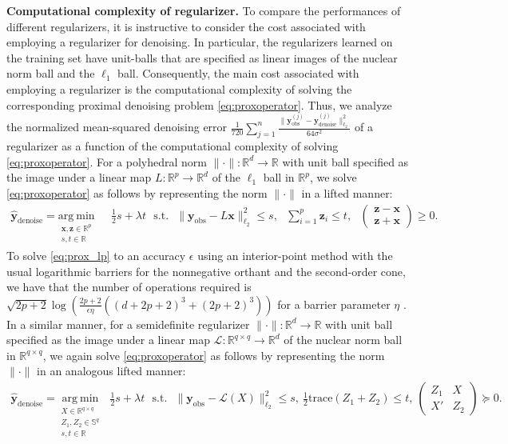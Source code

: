\documentclass[11pt,letterpaper]{article}
\newcommand{\R}{\mathbb{R}}
\newcommand{\bx}{\mathbf{x}}
\newcommand{\by}{\mathbf{y}}
\newcommand{\bz}{\mathbf{z}}
\renewcommand{\L}{\mathcal{L}}
\newcommand{\argmin}{\mathrm{arg~min}}
\begin{document}
\textbf{Computational complexity of regularizer.} To compare the performances of different regularizers, it is instructive to consider the cost associated with employing a regularizer for denoising.  In particular, the regularizers learned on the training set have unit-balls that are specified as linear images of the nuclear norm ball and the $\ell_1$ ball.  Consequently, the main cost associated with employing a regularizer is the computational complexity of solving the corresponding proximal denoising problem \eqref{eq:proxoperator}.  Thus, we analyze the normalized mean-squared denoising error $\frac{1}{720} \sum_{j=1}^n \frac{\|\by^{(j)}_{\mathrm{obs}} - \by^{(j)}_{\mathrm{denoise}}\|_{\ell_2}^2}{64 \sigma^2}$ of a regularizer as a function of the computational complexity of solving \eqref{eq:proxoperator}.  For a polyhedral norm $\|\cdot\| : \R^d \rightarrow \R$ with unit ball specified as the image under a linear map $L : \R^p \rightarrow \R^d$ of the $\ell_1$ ball in $\R^p$, we solve \eqref{eq:proxoperator} as follows by representing the norm $\|\cdot\|$ in a lifted manner:
\begin{equation} \label{eq:prox_lp}
\begin{aligned}
\hat{\by}_{\mathrm{denoise}} = \underset{\substack{\bx, \bz \in \R^p \\ s, t \in \R}}{\argmin} ~~~ & \tfrac{1}{2} s + \lambda t ~~~ \mathrm{s.t.} ~~~ \|\by_{\mathrm{obs}} - L \bx\|_{\ell_2}^2 \leq s , ~~~ \sum_{i=1}^p \bz_i \leq t , ~~~ \begin{pmatrix}\bz - \bx \\ \bz + \bx \end{pmatrix} \geq 0.
\end{aligned}
\end{equation}
To solve \eqref{eq:prox_lp} to an accuracy $\epsilon$ using an interior-point method with the usual logarithmic barriers for the nonnegative orthant and the second-order cone, we have that the number of operations required is $\sqrt{2p+2} \log\left(\frac{2p+2}{\epsilon \eta}\left((d+2p+2)^3 + (2p+2)^3\right) \right)$ for a barrier parameter $\eta$ \cite{NesNem:94,Ren:01}.  In a similar manner, for a semidefinite regularizer $\|\cdot\| : \R^d \rightarrow \R$ with unit ball specified as the image under a linear map $\L : \R^{q \times q} \rightarrow \R^d$ of the nuclear norm ball in $\R^{q \times q}$, we again solve \eqref{eq:proxoperator} as follows by representing the norm $\|\cdot\|$ in an analogous lifted manner:
\begin{equation} \label{eq:prox_sdp}
\begin{aligned}
\hat{\by}_{\mathrm{denoise}} = \underset{\substack{X \in \R^{q \times q} \\ Z_1, Z_2 \in \mathbb{S}^q \\ s, t \in \R}}{\argmin} ~~~ \tfrac{1}{2} s + \lambda t ~~~ \mathrm{s.t.} ~~~ \|\by_{\mathrm{obs}} - \L(X)\|_{\ell_2}^2 \leq s, ~ \tfrac{1}{2}\mathrm{trace}(Z_1+Z_2) \leq t, ~ \begin{pmatrix}Z_1 & X \\ X' & Z_2 \end{pmatrix} \succeq 0.
\end{aligned}
\end{equation}
\end{document}
